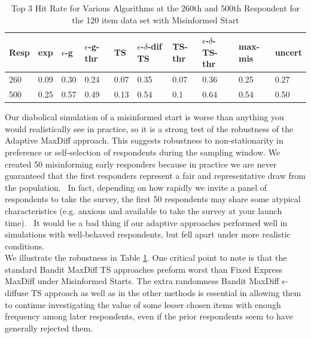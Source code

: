 \documentclass[nonblindrev]{informs3}
\newcommand{\fixedexpressS}{\textbf{exp}}
\newcommand{\egreedyS}{$\epsilon$-\textbf{g}}
\newcommand{\egreedythresS}{$\epsilon$-\textbf{g-thr}}
\newcommand{\misminS}{\textbf{max-mis}}
\newcommand{\tsS}{\textbf{TS} }
\newcommand{\edtsS}{$\epsilon$-$\delta$-\textbf{dif TS} }
\newcommand{\tsthresS}{\textbf{TS-thr} }
\newcommand{\edtsthresS}{$\epsilon$-$\delta$-\textbf{TS-thr} }
\newcommand{\uncertS}{\textbf{uncert} }
\begin{document}
\begin{table}
\begin{tabular}{llllllllll}
\hline   Resp &  \fixedexpressS&\egreedyS&\egreedythresS&\tsS&\edtsS&\tsthresS&\edtsthresS& \misminS& \uncertS   \\ \hline    260 &   0.09 &   0.30 & 0.24 & 0.07  & 0.35 & 0.07 &  0.36 & 0.25 &   0.27 \\
  500 &  0.25 &   0.57 &  0.49 &  0.13 & 0.54 &   0.1 &    0.64 & 0.54 &  0.50  \end{tabular}
\begin{center}
\caption{Top 3 Hit Rate for Various Algorithms at the 260th and 500th Respondent for the 120 item data set with Misinformed Start}
\label{table:120mis}
\end{center}
\end{table}

Our diabolical simulation of a misinformed start is worse than anything you would realistically see in practice, so it is a strong test of the robustness of the Adaptive MaxDiff approach. This suggests robustness to non-stationarity in preference or self-selection of respondents during the sampling window. We created 50 misinforming early responders because in practice we are never guaranteed that the first responders represent a fair and representative draw from the population.  In fact, depending on how rapidly we invite a panel of respondents to take the survey, the first 50 respondents may share some atypical characteristics (e.g. anxious and available to take the survey at your launch time).  It would be a bad thing if our adaptive approaches performed well in simulations with well-behaved respondents, but fell apart under more realistic conditions. \\

We illustrate the robustness in Table \ref{table:120mis}. One critical point to note is that the standard Bandit MaxDiff TS approaches preform worst than Fixed Express MaxDiff under Misinformed Starts.  The extra randomness Bandit MaxDiff $\epsilon$-diffuse TS approach as well as in the other methods  is essential in allowing them to continue investigating the value of some lesser chosen items with enough frequency among later respondents, even if the prior respondents seem to have generally rejected them.
\end{document}
